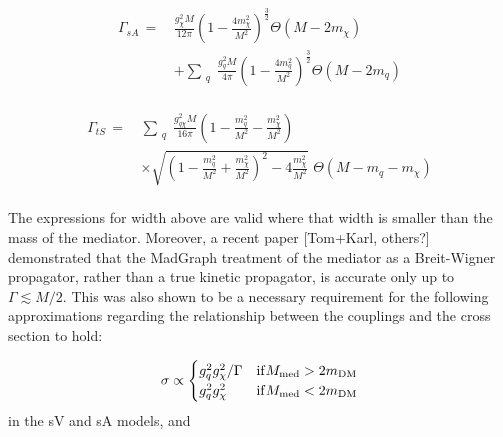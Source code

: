 \begin{equation}
  \begin{split}
    \Gamma_{sA} \, = \, & \frac{g_{\chi}^2 M}{12\pi}\left(1 - \frac{4m_{\chi}^{2}}{M^{2}}\right)^{\frac{3}{2}} \Theta(M-2m_{\chi}) \\
                  & + \sum_{\substack{q}}\frac{g_q^2 M}{4\pi}\left(1 - \frac{4m_{q}^{2}}{M^{2}}\right)^{\frac{3}{2}} \Theta(M-2m_q) \\
  \end{split}
\end{equation}

\begin{equation}
  \begin{split}
    \Gamma_{tS} \, = \, & \sum_{\substack{q}} \frac{g_{q\chi}^2M}{16\pi}\left(1 - \frac{m_{q}^{2}}{M^{2}} - \frac{m_{\chi}^{2}}{M^{2}}\right) \\
                  & \times \sqrt{\left(1 - \frac{m_{q}^{2}}{M^{2}} + \frac{m_{\chi}^{2}}{M^{2}}\right)^{2} - 4\frac{m_{\chi}^{2}}{M^{2}}} \,\, \Theta(M-m_q-m_{\chi}) \\
  \end{split}
\end{equation}

The expressions for width above are valid where that width is smaller than the mass of the mediator. Moreover, a recent paper [Tom+Karl, others?] demonstrated that the MadGraph treatment of the mediator as a Breit-Wigner propagator, rather than a true kinetic propagator, is accurate only up to $\Gamma \lesssim M/2$. This was also shown to be a necessary requirement for the following approximations regarding the relationship between the couplings and the cross section to hold:

\begin{equation}
  \sigma \propto
  \begin{cases}
      g_q^2 g_{\chi}^2 / \Gamma & \mathrm{ if } M_{\mathrm{med}} > 2 m_{\mathrm{DM}}\\
      g_q^2 g_{\chi}^2 & \mathrm{ if } M_{\mathrm{med}} < 2 m_{\mathrm{DM}}
  \end{cases}
  \label{eq:sigma_propto_couplings_schan}
\end{equation}
in the sV and sA models, and


